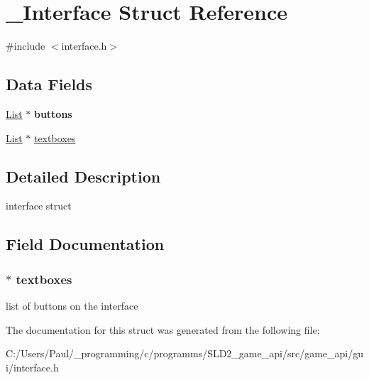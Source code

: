 \hypertarget{struct___interface}{\section{\+\_\+\+Interface Struct Reference}
\label{struct___interface}
}


{\ttfamily \#include $<$interface.\+h$>$}

\subsection*{Data Fields}
\begin{DoxyCompactItemize}
\item 
\hypertarget{struct___interface_ad2c23a8f255abea926c8982e81ca84a0}{\hyperlink{struct___list}{List} $\ast$ {\bfseries buttons}}\label{struct___interface_ad2c23a8f255abea926c8982e81ca84a0}

\item 
\hyperlink{struct___list}{List} $\ast$ \hyperlink{struct___interface_afe02db5bce1405040b669fd456fb8825}{textboxes}
\end{DoxyCompactItemize}


\subsection{Detailed Description}
interface struct 

\subsection{Field Documentation}
\hypertarget{struct___interface_afe02db5bce1405040b669fd456fb8825}{
\subsubsection[{textboxes}]{$\ast$ textboxes}}\label{struct___interface_afe02db5bce1405040b669fd456fb8825}
list of buttons on the interface 

The documentation for this struct was generated from the following file\+:\begin{DoxyCompactItemize}
\item 
C\+:/\+Users/\+Paul/\+\_\+programming/c/programms/\+S\+L\+D2\+\_\+game\+\_\+api/src/game\+\_\+api/gui/interface.\+h\end{DoxyCompactItemize}
